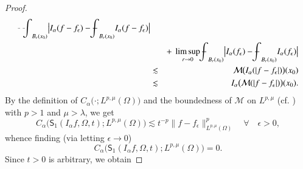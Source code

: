 \documentclass[12pt]{amsart}
\begin{document}
\begin{proof}
\begin{eqnarray*}
{{{{{\vcenter{\hbox{$\scriptscriptstyle{-}$ }}\kern-.6\wd0}}}{{{\setbox0=\hbox{$\scriptscriptstyle{\scriptscriptstyle{-}}{\int}$ }
\vcenter{\hbox{$\scriptscriptstyle{-}$ }}\kern-.6\wd0}}}\!\int}}_{B_r(x_0)}\big|I_\alpha
(f-f_\epsilon)-{{\mathchoice
{{{\setbox0=\hbox{$\displaystyle{\textstyle{-}}{\int}$ }
\vcenter{\hbox{$\textstyle{-}$ }}\kern-.6\wd0}}}{{{\setbox0=\hbox{$\textstyle{\scriptstyle{-}}{\int}$ }
\vcenter{\hbox{$\scriptstyle{-}$ }}\kern-.6\wd0}}}{{{\setbox0=\hbox{$\scriptstyle{\scriptscriptstyle{-}}{\int}$ }
\vcenter{\hbox{$\scriptscriptstyle{-}$ }}\kern-.6\wd0}}}{{{\setbox0=\hbox{$\scriptscriptstyle{\scriptscriptstyle{-}}{\int}$ }
\vcenter{\hbox{$\scriptscriptstyle{-}$ }}\kern-.6\wd0}}}\!\int}}_{B_r(x_0)}I_\alpha(f-f_\epsilon)\big|\\
&&+\ \limsup_{r\to 0}{{\mathchoice
{{{\setbox0=\hbox{$\displaystyle{\textstyle{-}}{\int}$ }
\vcenter{\hbox{$\textstyle{-}$ }}\kern-.6\wd0}}}{{{\setbox0=\hbox{$\textstyle{\scriptstyle{-}}{\int}$ }
\vcenter{\hbox{$\scriptstyle{-}$ }}\kern-.6\wd0}}}{{{\setbox0=\hbox{$\scriptstyle{\scriptscriptstyle{-}}{\int}$ }
\vcenter{\hbox{$\scriptscriptstyle{-}$ }}\kern-.6\wd0}}}{{{\setbox0=\hbox{$\scriptscriptstyle{\scriptscriptstyle{-}}{\int}$ }
\vcenter{\hbox{$\scriptscriptstyle{-}$ }}\kern-.6\wd0}}}\!\int}}_{B_r(x_0)}\big|I_\alpha
(f_\epsilon)-{{\mathchoice
{{{\setbox0=\hbox{$\displaystyle{\textstyle{-}}{\int}$ }
\vcenter{\hbox{$\textstyle{-}$ }}\kern-.6\wd0}}}{{{\setbox0=\hbox{$\textstyle{\scriptstyle{-}}{\int}$ }
\vcenter{\hbox{$\scriptstyle{-}$ }}\kern-.6\wd0}}}{{{\setbox0=\hbox{$\scriptstyle{\scriptscriptstyle{-}}{\int}$ }
\vcenter{\hbox{$\scriptscriptstyle{-}$ }}\kern-.6\wd0}}}{{{\setbox0=\hbox{$\scriptscriptstyle{\scriptscriptstyle{-}}{\int}$ }
\vcenter{\hbox{$\scriptscriptstyle{-}$ }}\kern-.6\wd0}}}\!\int}}_{B_r(x_0)}I_\alpha(f_\epsilon)\big|\\
&\lesssim& \mathcal{M}\big(I_\alpha (|f-f_\epsilon|)\big)(x_0)\\
&\lesssim&I_\alpha\big(\mathcal{M}(|f-f_\epsilon|)\big)(x_0).
\end{eqnarray*}
By the definition of $C_\alpha\big(\cdot;L^{p,\mu}(\Omega)\big)$ and
the boundedness of $\mathcal{M}$ on $L^{p,\mu}$ (cf. \cite{CF1988}) with $p>1$
and $\mu>\lambda$, we get
$$
C_\alpha\big(\mathsf{S}_1(I_\alpha
f,\Omega,t);L^{p,\mu}(\Omega)\big)\lesssim
t^{-p}\|f-f_\epsilon\|_{L^{p,\mu}(\Omega)}^{p}\quad\forall\quad
\epsilon>0,
$$
whence finding (via letting $\epsilon\to 0$)
$$
C_\alpha\big(\mathsf{S}_1(I_\alpha
f,\Omega,t);L^{{p},\mu}(\Omega)\big)=0.
$$
Since $t>0$ is arbitrary, we obtain

\end{proof}
\end{document}
